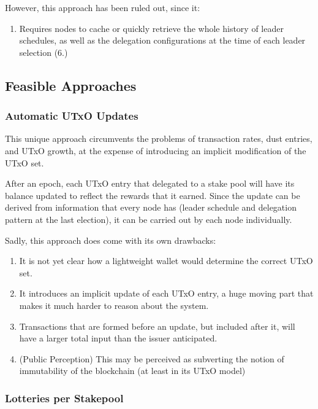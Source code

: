 \documentclass[11pt,a4paper]{article}
\begin{document}
However, this approach has been ruled out, since it:

\begin{enumerate}
\item
  Requires nodes to cache or quickly retrieve the whole history of
  leader schedules, as well as the delegation configurations at the time
  of each leader selection (6.)
\end{enumerate}

\subsection{Feasible Approaches}
\label{feasible-approaches}

\subsubsection{Automatic UTxO Updates}
\label{automatic-utxo-updates}

This unique approach circumvents the problems of transaction rates, dust
entries, and UTxO growth, at the expense of introducing an implicit
modification of the UTxO set.

After an epoch, each UTxO entry that delegated to a stake pool will have
its balance updated to reflect the rewards that it earned. Since the
update can be derived from information that every node has (leader
schedule and delegation pattern at the last election), it can be carried
out by each node individually.

Sadly, this approach does come with its own drawbacks:

\begin{enumerate}
\item
  It is not yet clear how a lightweight wallet would determine the
  correct UTxO set.
\item
  It introduces an implicit update of each UTxO entry, a huge moving
  part that makes it much harder to reason about the system.
\item
  Transactions that are formed before an update, but included after it,
  will have a larger total input than the issuer anticipated.
\item
  (Public Perception) This may be perceived as subverting the notion of
  immutability of the blockchain (at least in its UTxO model)
\end{enumerate}

\subsubsection{Lotteries per Stakepool}
\label{lotteries-per-stakepool}
\end{document}
